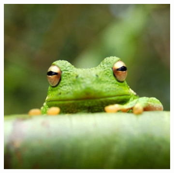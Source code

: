 \documentclass[twocolumn, 9pt]{extarticle}
\begin{document}
\begin{figure}[ht]
\begin{subfigure}[b]{0.1\linewidth}
    \caption{}
    \label{subfig:frog4h}
\end{subfigure}
\begin{subfigure}[b]{0.1\linewidth}
    \includegraphics[width=\linewidth]{frog.jpg}
    \caption{}
    \label{subfig:frog4i}
\end{subfigure}


\end{figure}
\end{document}
